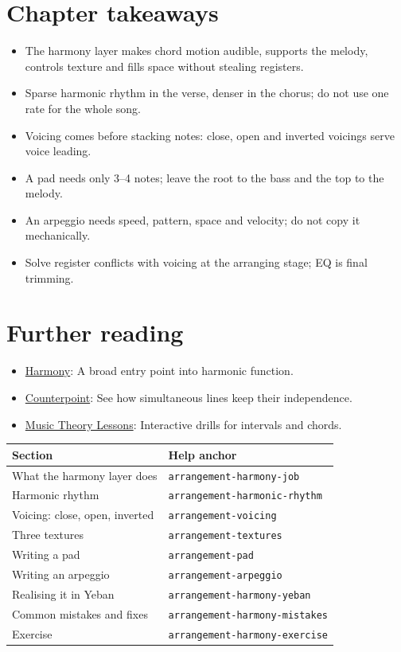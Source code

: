 \section{Chapter takeaways}
\label{sec:harmony-takeaways}

\begin{itemize}
\item The harmony layer makes chord motion audible, supports the melody, controls texture and fills space without stealing registers.
\item Sparse harmonic rhythm in the verse, denser in the chorus; do not use one rate for the whole song.
\item Voicing comes before stacking notes: close, open and inverted voicings serve voice leading.
\item A pad needs only 3--4 notes; leave the root to the bass and the top to the melody.
\item An arpeggio needs speed, pattern, space and velocity; do not copy it mechanically.
\item Solve register conflicts with voicing at the arranging stage; EQ is final trimming.
\end{itemize}

\section{Further reading}
\label{sec:04-harmony-further-reading}
\begin{itemize}
  \item \href{https://en.wikipedia.org/wiki/Harmony}{Harmony}: A broad entry point into harmonic function.
  \item \href{https://en.wikipedia.org/wiki/Counterpoint}{Counterpoint}: See how simultaneous lines keep their independence.
  \item \href{https://www.musictheory.net/lessons}{Music Theory Lessons}: Interactive drills for intervals and chords.
\end{itemize}

\begin{helpmapping}
\begin{longtable}{p{}p{}}
\toprule
Section & Help anchor \\
\midrule
What the harmony layer does & \texttt{arrangement-harmony-job} \\
Harmonic rhythm & \texttt{arrangement-harmonic-rhythm} \\
Voicing: close, open, inverted & \texttt{arrangement-voicing} \\
Three textures & \texttt{arrangement-textures} \\
Writing a pad & \texttt{arrangement-pad} \\
Writing an arpeggio & \texttt{arrangement-arpeggio} \\
Realising it in Yeban & \texttt{arrangement-harmony-yeban} \\
Common mistakes and fixes & \texttt{arrangement-harmony-mistakes} \\
Exercise & \texttt{arrangement-harmony-exercise} \\
\bottomrule
\end{longtable}
\end{helpmapping}
